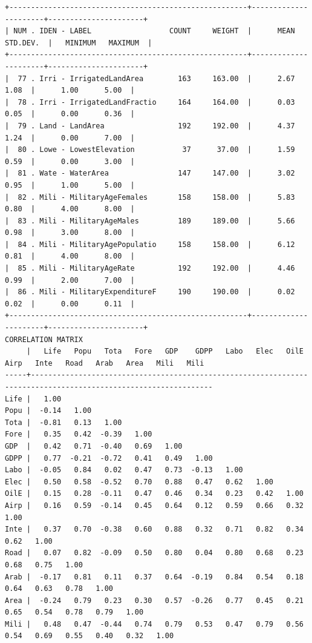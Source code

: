 \documentclass[a4paper,10pt,twocolumn]{article}
\begin{document}
\begin{landscape}
\begin{verbatim}
+-------------------------------------------------------+----------------------+----------------------+
| NUM . IDEN - LABEL                  COUNT     WEIGHT  |      MEAN  STD.DEV.  |   MINIMUM   MAXIMUM  |
+-------------------------------------------------------+----------------------+----------------------+
|  77 . Irri - IrrigatedLandArea        163     163.00  |      2.67      1.08  |      1.00      5.00  |
|  78 . Irri - IrrigatedLandFractio     164     164.00  |      0.03      0.05  |      0.00      0.36  |
|  79 . Land - LandArea                 192     192.00  |      4.37      1.24  |      0.00      7.00  |
|  80 . Lowe - LowestElevation           37      37.00  |      1.59      0.59  |      0.00      3.00  |
|  81 . Wate - WaterArea                147     147.00  |      3.02      0.95  |      1.00      5.00  |
|  82 . Mili - MilitaryAgeFemales       158     158.00  |      5.83      0.80  |      4.00      8.00  |
|  83 . Mili - MilitaryAgeMales         189     189.00  |      5.66      0.98  |      3.00      8.00  |
|  84 . Mili - MilitaryAgePopulatio     158     158.00  |      6.12      0.81  |      4.00      8.00  |
|  85 . Mili - MilitaryAgeRate          192     192.00  |      4.46      0.99  |      2.00      7.00  |
|  86 . Mili - MilitaryExpenditureF     190     190.00  |      0.02      0.02  |      0.00      0.11  |
+-------------------------------------------------------+----------------------+----------------------+
CORRELATION MATRIX
     |   Life   Popu   Tota   Fore   GDP    GDPP   Labo   Elec   OilE   Airp   Inte   Road   Arab   Area   Mili   Mili
-----+----------------------------------------------------------------------------------------------------------------
Life |   1.00
Popu |  -0.14   1.00
Tota |  -0.81   0.13   1.00
Fore |   0.35   0.42  -0.39   1.00
GDP  |   0.42   0.71  -0.40   0.69   1.00
GDPP |   0.77  -0.21  -0.72   0.41   0.49   1.00
Labo |  -0.05   0.84   0.02   0.47   0.73  -0.13   1.00
Elec |   0.50   0.58  -0.52   0.70   0.88   0.47   0.62   1.00
OilE |   0.15   0.28  -0.11   0.47   0.46   0.34   0.23   0.42   1.00
Airp |   0.16   0.59  -0.14   0.45   0.64   0.12   0.59   0.66   0.32   1.00
Inte |   0.37   0.70  -0.38   0.60   0.88   0.32   0.71   0.82   0.34   0.62   1.00
Road |   0.07   0.82  -0.09   0.50   0.80   0.04   0.80   0.68   0.23   0.68   0.75   1.00
Arab |  -0.17   0.81   0.11   0.37   0.64  -0.19   0.84   0.54   0.18   0.64   0.63   0.78   1.00
Area |  -0.24   0.79   0.23   0.30   0.57  -0.26   0.77   0.45   0.21   0.65   0.54   0.78   0.79   1.00
Mili |   0.48   0.47  -0.44   0.74   0.79   0.53   0.47   0.79   0.56   0.54   0.69   0.55   0.40   0.32   1.00

\end{verbatim}
\end{landscape}
\end{document}
